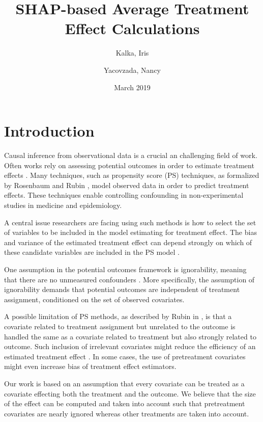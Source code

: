 \documentclass{article}
\title{SHAP-based Average Treatment Effect Calculations}
\author{Kalka, Iris
        \and
        Yacovzada, Nancy}
\date{March 2019}
\begin{document}
\maketitle

\section{Introduction}
Causal inference from observational data is a crucial an challenging field of work. Often works rely on assessing potential outcomes in order to estimate treatment effects \cite{neyman1923application}\cite{rubin1974estimating}. Many techniques, such as propensity score (PS) techniques, as formalized by Rosenbaum and Rubin \cite{rosenbaum1983central}, model observed data in order to predict treatment effects. These techniques enable controlling confounding in non-experimental studies in medicine and epidemiology. 


A central issue researchers are facing using such methods is how to select the set of variables to be included in the model estimating for treatment effect. The bias and variance of the estimated treatment effect can depend strongly on which of these candidate variables are included in the PS model \cite{brookhart2006variable}.

One assumption in the potential outcomes framework is ignorability, meaning that there are no unmeasured confounders \cite{rosenbaum1983central}. More specifically, the assumption of ignorability demands that potential outcomes are independent of treatment assignment, conditioned on the set of observed covariates.

A possible limitation of PS methods, as described by Rubin in \cite{rubin1997estimating}, is that a covariate related to treatment assignment but unrelated to the outcome is handled the same as a covariate related to treatment but also strongly related to outcome. Such inclusion of irrelevant covariates might reduce the efficiency of an estimated treatment effect \cite{10.1093/biomet/asx009}. In some cases, the use of pretreatment covariates might even increase bias of treatment effect estimators.

Our work is based on an assumption that every covariate can be treated as a covariate effecting both the treatment and the outcome. 
We believe that the size of the effect can be computed and taken into account such that pretreatment covariates are nearly ignored whereas other treatments are taken into account. 
\end{document}
